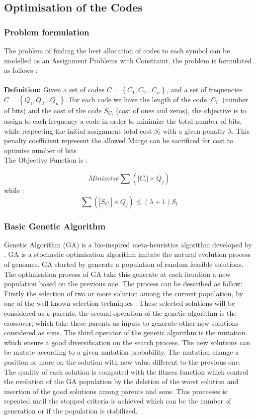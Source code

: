 \documentclass[preprint,12pt]{elsarticle}
\begin{document}
\subsection{Optimisation of the Codes}
\subsubsection{Problem formulation}
The problem of finding the best allocation of codes to each symbol can be   modelled as an Assignment Problems with Constraint, the problem is formulated as follows :\\\\
\textbf{Definition:} Given a set of codes $C=\left\{C_{1},C_{2}...C_{n}\right\}$, and a set of frequencies $C=\left\{Q_{1},Q_{2}...Q_{n}\right\}$. For each code we have the length of the code $|C_{i}|$ (number of bits) and the cost of the code $S_{C_{i}}$ (cost of ones and zeros), the objective is to assign to each frequency a code in order to minimize the total number of bits, while respecting the initial assignment total cost $S_{t}$ with a given penalty $\lambda$. This penalty coefficient represent the allowed Marge can be sacrificed for cost to optimise number of bits    
\\
The Objective Function is : 

\begin{equation}
Minimise \sum (|C_{i}| \times Q_{j}) 
\end{equation}
while :
\begin{equation}
\sum (|S_{C_{i}}| \times Q_{j}) \leqslant (\lambda+1) S_{t} 
\end{equation}

\subsubsection{Basic Genetic Algorithm}
Genetic Algorithm (GA) is a bio-inspired meta-heuristics algorithm developed by \cite{gen1}. GA is a stochastic optimisation algorithm imitate the natural evolution process of genomes. GA started by generate a population of random feasible solutions. The optimisation process of GA take this generate at each iteration a new population based on the previous one.  The process can be described as follow: Firstly the selection of two or more solution among the current population, by one of the well-known selection techniques \cite{bli95}. These selected solutions will be considered as a parents, the second operation of the genetic algorithm is the crossover, which take these parents as inputs to generate other new solutions considered as sons. The third operator of the genetic algorithm is the mutation which ensure a good diversification on the search process. The new solutions can be mutate according to a given mutation probability. The mutation change a position or more on the solution with new value different to the previous one. The quality of each solution is computed with the fitness function which control the evolution of the GA population by the deletion of the worst solution and insertion of the good solutions among  parents and sons. This processes is repeated until the stopped criteria is achieved which can be the number of generation or if the population is stabilized.
\end{document}
